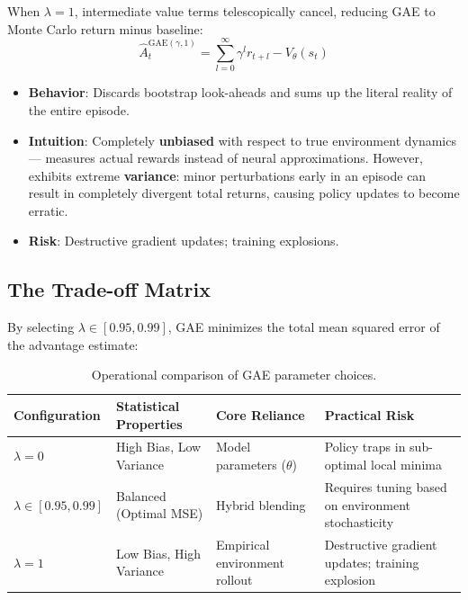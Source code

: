\begin{keybox}[Low Bias / High Variance Limit ($\lambda = 1$)]
When $\lambda = 1$, intermediate value terms telescopically cancel, reducing GAE to Monte Carlo return minus baseline: 
\begin{equation}
\hat{A}_t^{\text{GAE}(\gamma, 1)} = \sum_{l=0}^{\infty} \gamma^l r_{t+l} - V_\theta(s_t)
\end{equation}

\begin{itemize}
  \item \textbf{Behavior}: Discards bootstrap look-aheads and sums up the literal reality of the entire episode.
  \item \textbf{Intuition}: Completely \textbf{unbiased} with respect to true environment dynamics --- measures actual rewards instead of neural approximations. However, exhibits extreme \textbf{variance}: minor perturbations early in an episode can result in completely divergent total returns, causing policy updates to become erratic.
  \item \textbf{Risk}: Destructive gradient updates; training explosions.
\end{itemize}
\end{keybox}

\subsection{The Trade-off Matrix}
\label{the-trade-off-matrix}

By selecting $\lambda \in [0.95, 0.99]$, GAE minimizes the total mean squared error of the advantage estimate:

\begin{table}[ht!]
\centering
\caption{Operational comparison of GAE parameter choices.}
\begin{tabular}{@{}lp{3.5cm}p{3.5cm}p{6cm}@{}}
\toprule
\textbf{Configuration} & \textbf{Statistical Properties} & \textbf{Core Reliance} & \textbf{Practical Risk} \\
\midrule
$\lambda = 0$ & High Bias, Low Variance & Model parameters ($\theta$) & Policy traps in sub-optimal local minima \\
$\lambda \in [0.95, 0.99]$ & Balanced (Optimal MSE) & Hybrid blending & Requires tuning based on environment stochasticity \\
$\lambda = 1$ & Low Bias, High Variance & Empirical environment rollout & Destructive gradient updates; training explosion \\
\bottomrule
\end{tabular}
\end{table}

